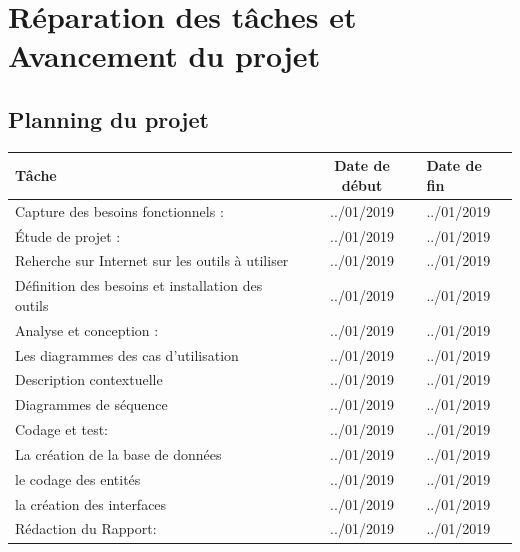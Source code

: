 \documentclass[12pt,a4paper]{article}
\begin{document}
\section{Réparation des tâches et Avancement du projet}

\subsection{Planning du projet}

\begin{tabularx}{\textwidth}{|l|c|X|}
  \hline
  \textbf{Tâche } & 
  \textbf{Date de début} & 
  \textbf{Date de fin} \\
  \hline
  \hline
  \hline
  Capture des besoins fonctionnels :& ../01/2019 & ../01/2019
  \\ 
   \hline
    \hline
     \hline
 
 Étude de projet : & ../01/2019 &  ../01/2019
    \\
  \hline
 Reherche sur Internet sur les outils à utiliser  & ../01/2019 &  ../01/2019
    \\
  \hline
 Définition des besoins et installation des outils  & ../01/2019 &  ../01/2019
    \\
  \hline
 \hline
  \hline
  Analyse et conception :& ../01/2019 & ../01/2019
  \\ 
   \hline
  \hline
   \hline
  Les diagrammes des cas d'utilisation & ../01/2019 &  ../01/2019 
    \\
  \hline
 Description contextuelle & ../01/2019 &  ../01/2019
    \\
  \hline
  Diagrammes de séquence & ../01/2019 &  ../01/2019
    \\
    \hline
     \hline
      \hline
 
Codage et test: & ../01/2019 &  ../01/2019
    \\
      \hline
       \hline
        \hline
    
La création de la base de données & ../01/2019 &  ../01/2019
    \\
     \hline
le codage des entités & ../01/2019 &  ../01/2019
    \\
         \hline
la création des interfaces & ../01/2019 &  ../01/2019
    \\
       \hline
        \hline
         \hline

Rédaction du Rapport: & ../01/2019 &  ../01/2019
  \\
  \hline
   \hline
    \hline

\end{tabularx}
\end{document}
